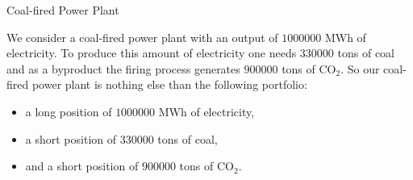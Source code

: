 {Coal-fired Power Plant}

We consider a coal-fired power plant with an output of $1000000$
MWh of electricity. To produce this amount of electricity one
needs $330000$ tons of coal and as a byproduct the firing process
generates $900000$ tons of CO$_2$. So our coal-fired power plant
is nothing else than the following portfolio:
        \begin{itemize}
            \item a long position of $1000000$ MWh of electricity,
            \item a short position of $330000$ tons of coal,
            \item and a short position of $900000$ tons of CO$_2$.
        \end{itemize}


